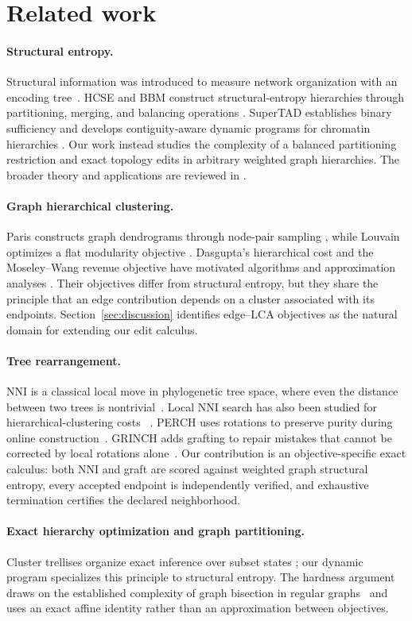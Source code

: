 \section{Related work}\label{sec:related}

\paragraph{Structural entropy.}
Structural information was introduced to measure network organization with an
encoding tree~\cite{li2016}. HCSE and BBM construct structural-entropy
hierarchies through partitioning, merging, and balancing operations
\cite{pan2025}. SuperTAD establishes binary sufficiency and develops
contiguity-aware dynamic programs for chromatin hierarchies
\cite{zhang2021supertad}. Our work instead studies the complexity of a balanced
partitioning restriction and exact topology edits in arbitrary weighted graph
hierarchies. The broader theory and applications are reviewed in
\cite{su2025survey}.

\paragraph{Graph hierarchical clustering.}
Paris constructs graph dendrograms through node-pair sampling
\cite{bonald2018paris}, while Louvain optimizes a flat modularity objective
\cite{blondel2008}. Dasgupta's hierarchical cost and the Moseley--Wang revenue
objective have motivated algorithms and approximation analyses
\cite{dasgupta2016,moseley2017}. Their objectives differ from structural
entropy, but they share the principle that an edge contribution depends on a
cluster associated with its endpoints. Section~\ref{sec:discussion} identifies
edge--LCA objectives as the natural domain for extending our edit calculus.

\paragraph{Tree rearrangement.}
NNI is a classical local move in phylogenetic tree space, where even the
distance between two trees is nontrivial~\cite{litrompzhang1996}. Local NNI
search has also been studied for hierarchical-clustering costs
~\cite{jowhari2024}. PERCH uses rotations to preserve purity during online
construction~\cite{kobren2017perch}. GRINCH adds grafting to repair mistakes
that cannot be corrected by local rotations alone~\cite{monath2019grinch}.
Our contribution is an objective-specific exact calculus: both NNI and graft
are scored against weighted graph structural entropy, every accepted endpoint
is independently verified, and exhaustive termination certifies the declared
neighborhood.

\paragraph{Exact hierarchy optimization and graph partitioning.}
Cluster trellises organize exact inference over subset states
\cite{macaluso2021}; our dynamic program specializes this principle to
structural entropy. The hardness argument draws on the established complexity
of graph bisection in regular graphs~\cite{bui1987graph}
and uses an exact affine identity rather than an approximation between
objectives.
